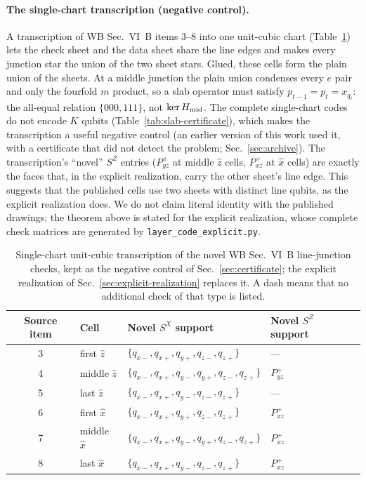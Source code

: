 \documentclass[aps,prx,reprint,superscriptaddress,nofootinbib,floatfix,longbibliography]{revtex4-2}
\theoremstyle{definition}
\begin{document}
\paragraph{The single-chart transcription (negative control).}
A transcription of WB Sec.~VI~B items 3--8 into one unit-cubic chart
(Table~\ref{tab:wb-support}) lets the check sheet and the data sheet share the
line edges and makes every junction star the union of the two sheet stars.
Glued, these cells form the plain union of the sheets.
At a middle junction the plain union condenses every $e$ pair and only the
fourfold $m$ product, so a slab operator must satisfy $p_{t-1}=p_t=x_{q_t}$:
the all-equal relation $\{000,111\}$, not $\ker H_{\rm mid}$.  The complete
single-chart codes do not encode $K$ qubits (Table~\ref{tab:slab-certificate}),
which makes the transcription a useful negative control (an earlier version
of this work used it, with a certificate that did not detect the problem;
Sec.~\ref{sec:archive}).  The transcription's ``novel'' $S^Z$ entries
($P^+_{yz}$ at middle $\hat z$ cells, $P^+_{xz}$ at $\hat x$ cells) are exactly
the faces that, in the explicit realization, carry the other sheet's line
edge.  This suggests that the published cells use two sheets with distinct
line qubits, as the explicit realization does.  We do not claim literal
identity with the published drawings; the theorem above is stated for the
explicit realization, whose complete check matrices are generated by
\texttt{layer\_code\_explicit.py}.

\begin{table}[t]
\caption{Single-chart unit-cubic transcription of the novel WB Sec.~VI~B
line-junction checks, kept as the negative control of
Sec.~\ref{sec:certificate}; the explicit realization of
Sec.~\ref{sec:explicit-realization} replaces it.  A
dash means that no additional check of that type is listed.}
\label{tab:wb-support}
\renewcommand{\arraystretch}{1.12}
\scriptsize
\begin{tabular}{@{}c p{2.3cm} p{6.0cm} p{5.6cm}@{}}
\toprule
Source item & Cell & Novel $S^X$ support & Novel $S^Z$ support \\
\midrule
3 & first $\hat z$ & $\{q_{x-},q_{x+},q_{y+},q_{z-},q_{z+}\}$ & --- \\
4 & middle $\hat z$ & $\{q_{x-},q_{x+},q_{y-},q_{y+},q_{z-},q_{z+}\}$ & $P_{yz}^{+}$ \\
5 & last $\hat z$ & $\{q_{x-},q_{x+},q_{y-},q_{z-},q_{z+}\}$ & --- \\
6 & first $\hat x$ & $\{q_{x-},q_{x+},q_{y+},q_{z-},q_{z+}\}$ & $P_{xz}^{+}$ \\
7 & middle $\hat x$ & $\{q_{x-},q_{x+},q_{y-},q_{y+},q_{z-},q_{z+}\}$ & $P_{xz}^{+}$ \\
8 & last $\hat x$ & $\{q_{x-},q_{x+},q_{y-},q_{z-},q_{z+}\}$ & $P_{xz}^{+}$ \\
\bottomrule
\end{tabular}
\end{table}
\end{document}

